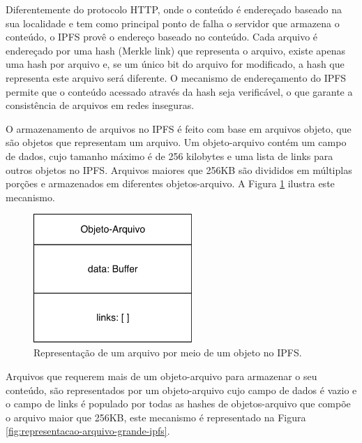 \documentclass[tcc,capa]{texufpel}
\begin{document}
    Diferentemente do protocolo HTTP, onde o conteúdo é endereçado baseado na sua localidade e tem como principal ponto de falha o servidor que armazena o conteúdo, o IPFS provê o endereço baseado no conteúdo. Cada arquivo é endereçado por uma hash (Merkle link) que representa o arquivo, existe apenas uma hash por arquivo e, se um único bit do arquivo for modificado, a hash que representa este arquivo será diferente. O mecanismo de endereçamento do IPFS permite que o conteúdo acessado através da hash seja verificável, o que garante a consistência de arquivos em redes inseguras.
    
    O armazenamento de arquivos no IPFS é feito com base em arquivos objeto, que são objetos que representam um arquivo. Um objeto-arquivo contém um campo de dados, cujo tamanho máximo é de 256 kilobytes e uma lista de links para outros objetos no IPFS. Arquivos maiores que 256KB são divididos em múltiplas porções e armazenados em diferentes objetos-arquivo. A Figura \ref{fig:arquivo-objeto-ipfs} ilustra este mecanismo.
    
    \begin{figure}[h!]
        \centering
        \includegraphics[width=6cm]{imagens/arquivo-objeto-ipfs.pdf}
        \caption{Representação de um arquivo por meio de um objeto no IPFS.}
        \label{fig:arquivo-objeto-ipfs}
    \end{figure}
    
    Arquivos que requerem mais de um objeto-arquivo para armazenar o seu conteúdo, são representados por um objeto-arquivo cujo campo de dados é vazio e o campo de links é populado por todas as hashes de objetos-arquivo que compõe o arquivo maior que 256KB, este mecanismo é representado na Figura \ref{fig:representacao-arquivo-grande-ipfs}.
    
\end{document}
